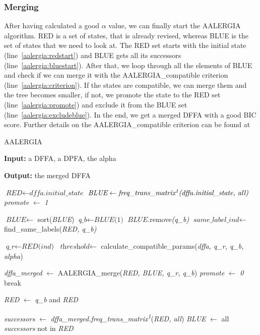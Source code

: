 \documentclass[
a4paper,     %
12pt         %
]{scrartcl}  %
\begin{document}
\subsubsection{Merging }

After having calculated a good $\alpha$ value, we can finally start the AALERGIA algorithm. RED is a set of states, that is already revised, whereas BLUE is the set of states that we need to look at. The RED set starts with the initial state (line~\ref{aalergia:redstart}) and BLUE gets all its successors (line~\ref{aalergia:bluestart}). After that, we loop through all the elements of BLUE and check if we can merge it with the AALERGIA\_compatible criterion (line~\ref{aalergia:criterion}). If the states are compatible, we can merge them and the tree becomes smaller, if not, we promote the state to the RED set (line~\ref{aalergia:promote}) and exclude it from the BLUE set (line~\ref{aalergia:excludeblue}). In the end, we get a merged DFFA with a good BIC score. Further details on the AALERGIA\_compatible criterion can be found at \cite{Mao.}

\begin{algorithm}[H]
\caption{AALERGIA}\label{alg:aalergia}
\begin{algorithmic}[1]
\item \textbf{Input:}  a DFFA, a DPFA, the alpha
\item \textbf{Output:} the merged DFFA

\State $\textit{RED} \gets \textit{dffa.initial\_state}$ \label{aalergia:redstart}
\State $\textit{BLUE} \gets \textit{freq\_trans\_matrix\textsuperscript{1}(dffa.initial\_state, all)}$ \label{aalergia:bluestart}
\State \textit{promote} $\gets$ \textit{1}


 \State $\textit{BLUE} \gets$ sort(\textit{BLUE})
 \State $\textit{q\_b} \gets \textit{BLUE(1)}$
 \State $\textit{BLUE}$.remove\textit{(q\_b)}
 \State $\textit{same\_label\_ind} \gets $find\_same\_labels(\textit{RED, q\_b)}

        \State $\textit{q\_r} \gets \textit{RED(ind)}$
        \State $\textit{threshold} \gets$ calculate\_compatible\_params(\textit{dffa, q\_r, q\_b, alpha})

         \label{aalergia:criterion}
          \State \textit{dffa\_merged} $\gets$ AALERGIA\_merge(\textit{RED, BLUE, q\_r, q\_b})
          \State \textit{promote} $\gets$ \textit{0}
          \State break
        \EndIf
\EndFor

          \State \textit{RED} $\gets$ \textit{q\_b} and \textit{RED} \label{aalergia:promote}
        \EndIf

    \State \textit{successors} $\gets$ \textit{dffa\_merged.freq\_trans\_matrix\textsuperscript{1}}(\textit{RED, all})
    \State \textit{BLUE} $\gets$ all \textit{successors} not in \textit{RED} \label{aalergia:excludeblue}
  \EndWhile
\end{algorithmic}
\end{algorithm}
\end{document}

